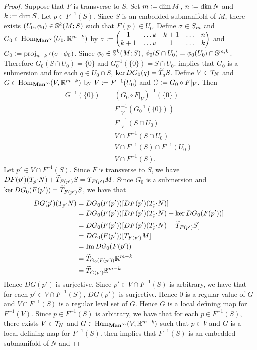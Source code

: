 \documentclass{book}
\begin{document}
	\begin{proof}
		Suppose that $F$ is transverse to $S$. Set $m \defeq \dim M$, $n \defeq \dim N$ and $k \defeq \dim S$. Let $p \in F^{-1}(S)$. Since $S$ is an embedded submanifold of $M$, there exists $(U_0, \phi_0) \in \S^k(M;S)$ such that $F(p) \in U_0$. Define $\sig \in S_m$ and $G_0 \in \Hom_{\bManinf}(U_0, \R^{m-k})$ by $\sig \defeq 
		\begin{pmatrix}
			1   & \ldots k & k+1 &  \ldots &  n \\
			k+1 & \ldots n & 1   &  \ldots &  k
		\end{pmatrix}$ 
		and $G_0 \defeq  \prj_{n-k} \circ (\sig \cdot \phi_0)$. Since $\phi_0 \in \S^k(M;S)$, $\phi_0(S \cap U_0) = \phi_0(U_0) \cap \S^{m,k}$. Therefore $G_0(S \cap U_0) = \{0\}$ and $G_0^{-1}(\{0\}) = S \cap U_0$.  implies that $G_0$ is a submersion and for each $q \in U_0 \cap S$, $\ker DG_0(q) = \wt{T}_qS$. Define $V \in \MT_N$ and $G \in \Hom_{\bManinf}(V, \R^{m-k})$ by $V \defeq F^{-1}(U_0)$ and $G \defeq G_0 \circ F|_{V}$. Then 
		\begin{align*}
			G^{-1}(\{0\})
			& = (G_0 \circ F|_{V})^{-1}(\{0\}) \\
			& = F|_{V}^{-1} (G_0^{-1}(\{0\})) \\
			& = F|_{V}^{-1}(S \cap U_0) \\
			& = V \cap F^{-1}(S \cap U_0) \\
			& = V \cap F^{-1}(S) \cap F^{-1}(U_0) \\
			& = V \cap F^{-1}(S). 
		\end{align*}
		Let $p' \in V \cap F^{-1}(S)$. Since $F$ is transverse to $S$, we have $DF(p')(T_{p'}N) + \wt{T}_{F(p')}S = T_{F(p')}M$. Since $G_0$ is a submersion and $\ker DG_0(F(p')) = \wt{T}_{F(p')}S$, we have that 
		\begin{align*}
			DG(p')(T_{p'}N)
			& = DG_0(F(p')) [ DF(p') (T_{p'} N)] \\
			& = DG_0(F(p')) [ DF(p')(T_{p'}N) + \ker DG_0(F(p')) ] \\
			& = DG_0(F(p')) [ DF(p')(T_{p'}N) + \wt{T}_{F(p')}S ] \\
			& = DG_0(F(p')) [ T_{F(p')} M ] \\
			& = \Im DG_0(F(p')) \\
			& = \wt{T}_{G_0(F(p'))} \R^{m-k} \\
			& = \wt{T}_{G(p')} \R^{m-k} 
		\end{align*}  
		Hence $DG(p')$ is surjective. Since $p' \in V \cap F^{-1}(S)$ is arbitrary, we have that for each $p' \in  V \cap F^{-1}(S)$, $DG(p')$ is surjective. Hence $0$ is a regular value of $G$ and $V \cap F^{-1}(S)$ is a regular level set of $G$. Hence $G$ is a local defining map for $F^{-1}(V)$. Since $p \in F^{-1}(S)$ is arbitrary, we have that for each $p \in F^{-1}(S)$, there exists $V \in \MT_N$ and $G \in \Hom_{\bManinf}(V, \R^{m-k})$ such that $p \in V$ and $G$ is a local defining map for $F^{-1}(S)$.  then implies that $F^{-1}(S)$ is an embedded submanifold of $N$ and

\end{proof}
\end{document}
